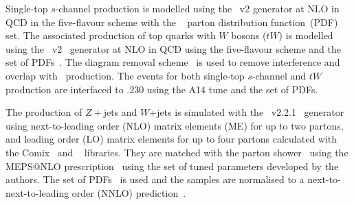 Single-top $s$-channel production is modelled using the \powhegbox~v2 %
generator at NLO in QCD in the five-flavour scheme with the \nnpdfnlo~\cite{Ball:2014uwa} parton distribution function~(PDF) set.
%
The associated production of top quarks with $W$ bosons ($tW$) is
modelled using the
\powhegbox~v2~\cite{Re:2010bp,Nason:2004rx,Frixione:2007vw,Alioli:2010xd}
generator at NLO in QCD using the five-flavour scheme and the
\nnpdfnlo set of PDFs~\cite{Ball:2014uwa}.
The diagram removal scheme~\cite{Frixione:2008yi} is used to
remove interference and overlap with \ttbar\ production. 
The events for both single-top $s$-channel and $tW$ production 
are interfaced to \pythia.230%
using the A14 tune%
and the \nnpdftwo set of PDFs. %

The production of $Z+$jets and $W$+jets is simulated with the
\sherpa~v2.2.1~\cite{Bothmann:2019yzt}
generator using next-to-leading order (NLO) matrix elements (ME) for up to two partons, and leading order (LO) matrix elements
for up to four partons calculated with the Comix~\cite{Gleisberg:2008fv}
and \openloops~\cite{Buccioni:2019sur,Cascioli:2011va,Denner:2016kdg} libraries. They
are matched with the \sherpa parton shower~\cite{Schumann:2007mg} using the MEPS@NLO
prescription~\cite{Hoeche:2011fd,Hoeche:2012yf,Catani:2001cc,Hoeche:2009rj}
using the set of tuned parameters developed by the \sherpa authors.
The \nnpdfnnlo set of PDFs~\cite{Ball:2014uwa} is used and the samples
are normalised to a next-to-next-to-leading order (NNLO)
prediction~\cite{Anastasiou:2003ds}.

